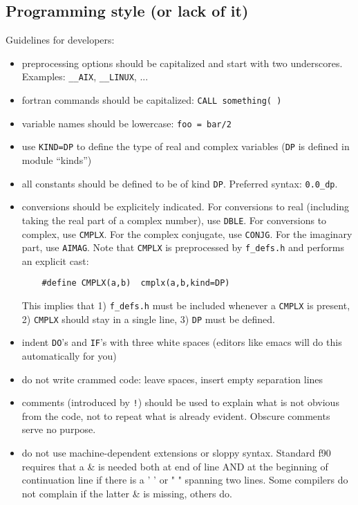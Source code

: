 \documentclass[12pt,a4paper]{article}
\begin{document}
\subsection{Programming style (or lack of it)}

Guidelines for developers:
\begin{itemize}
\item preprocessing options should be capitalized and start with two
underscores. Examples: \texttt{\_\_AIX}, \texttt{\_\_LINUX}, ...
\item fortran commands should be capitalized: \texttt{CALL something( )}
\item variable names should be lowercase: \texttt{foo = bar/2}
\item use \texttt{KIND=DP} to define the type of real and complex variables
(\texttt{DP} is defined in module ``kinds'')
\item all constants should be defined to be of kind \texttt{DP}.
Preferred syntax: \texttt{0.0\_dp}.
\item conversions should be explicitely indicated. For conversions to real
(including taking the real part of a complex number), use \texttt{DBLE}.
For conversions to complex, use \texttt{CMPLX}. For the complex conjugate,
use \texttt{CONJG}. For the imaginary part, use \texttt{AIMAG}.
Note that \texttt{CMPLX} is preprocessed by \texttt{f\_defs.h} 
and performs an explicit cast:
\begin{verbatim}
    #define CMPLX(a,b)  cmplx(a,b,kind=DP)
\end{verbatim}
This implies that 1) \texttt{f\_defs.h} must be included whenever a
\texttt{CMPLX} is present, 2) \texttt{CMPLX} should stay in a single line, 
3) \texttt{DP} must be defined.
\item indent \texttt{DO}'s and  \texttt{IF}'s with three white spaces
(editors like emacs will do this automatically for you)
\item do not write crammed code: leave spaces, insert empty separation
lines
\item comments (introduced by \texttt{!}) should be used to explain 
what is not obvious from the code, not to repeat what is already 
evident. Obscure comments serve no purpose.
\item do not use machine-dependent extensions or sloppy syntax.
Standard f90 requires that a \& is needed both at end of line 
AND at the beginning of continuation line if there is a ' ' 
or " " spanning two lines. Some compilers do not complain
if the latter \& is missing, others do.
\end{itemize}
\end{document}
